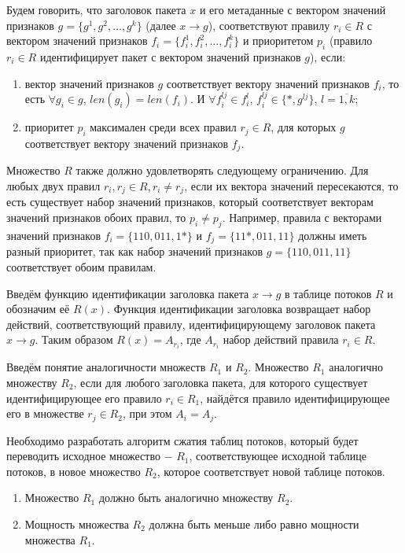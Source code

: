 \documentclass[oneside,final,12pt]{extarticle}
\begin{document}
        Будем говорить, что заголовок пакета \(x\) и его метаданные с вектором значений признаков \(g=\{g^1,g^2,\ldots,g^k\}\) (далее \(x \rightarrow g\)),
        соответствуют правилу \(r_i\in R\) с вектором значений признаков \(f_i=\{f_i^1,f_i^2,\ldots,f_i^k\}\) 
        и приоритетом \(p_i\) (правило \(r_i\in R\) идентифицирует пакет с вектором значений признаков \(g\)), если:

        \begin{enumerate}
            \item вектор значений признаков \(g\) соответствует вектору значений признаков \(f_i\), 
                то есть \(\forall g_i \in g\), \(len(g_i) = len(f_i)\). И \(\forall f_i^{lj} \in f_i^l\), \(f_i^{lj} \in \{*, g^{lj}\}\), \(l=\overline{1,k}\);
            \item приоритет \(p_i\) максимален среди всех правил \(r_j\in R\), для которых \(g\) соответствует вектору значений признаков \(f_j\).
        \end{enumerate}

        Множество \(R\) также должно удовлетворять следующему ограничению. 
        Для любых двух правил \(r_i,r_j\in R,r_i\not= r_j\), если их вектора значений пересекаются, то есть существует набор значений признаков, 
        который соответствует векторам значений признаков обоих правил, то \(p_i\not= p_j\). 
        Например, правила с векторами значений признаков \(f_i=\{110, 011, 1*\}\) и \(f_j=\{11*, 011, 11\}\) должны иметь разный приоритет, 
        так как набор значений признаков \(g=\{110, 011, 11\}\) соответствует обоим правилам.
        
        Введём функцию идентификации заголовка пакета \(x \rightarrow g\) в таблице потоков \(R\) и обозначим её \(R(x)\).
        Функция идентификации заголовка возвращает набор действий, соответствующий правилу, идентифицирующему заголовок пакета \(x \rightarrow g\).
        Таким образом \(R(x) = A_{r_i}\), где \(A_{r_i}\) набор действий правила \(r_i \in R\).

        Введём понятие аналогичности множеств \(R_1\) и \(R_2\).
        Множество \(R_1\) аналогично множеству \(R_2\), если для любого заголовка пакета, для которого существует идентифицирующее его правило \(r_i \in R_1\), 
        найдётся правило идентифицирующее его в множестве \(r_j \in R_2\), при этом \(A_i = A_j\).

        Необходимо разработать алгоритм сжатия таблиц потоков, который будет переводить исходное множество $-$ \(R_1\), соответствующее исходной таблице потоков, в
        новое множество \(R_2\), которое соответствует новой таблице потоков.
        \begin{enumerate}
            \item Множество \(R_1\) должно быть аналогично множеству \(R_2\).
            \item Мощность множества \(R_2\) должна быть меньше либо равно мощности множества \(R_1\).
        \end{enumerate}
\end{document}
